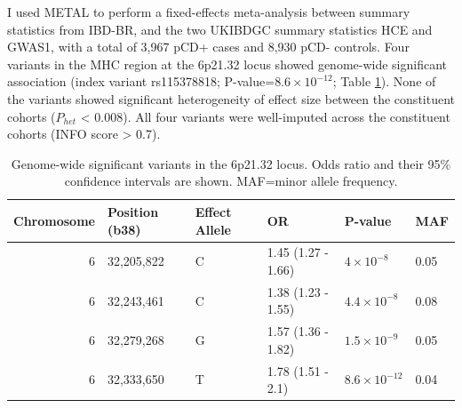 I used METAL to perform a fixed-effects meta-analysis between summary statistics from IBD-BR, and the two UKIBDGC summary statistics HCE and GWAS1, with a total of 3,967 pCD+ cases and 8,930 pCD- controls. 
  Four variants in the MHC region at the 6p21.32 locus showed genome-wide significant association (index variant rs115378818; P-value=$8.6\times10^{-12}$; Table \ref{table:gws}). None of the variants showed significant heterogeneity of effect size between the constituent cohorts ($P_{het}$ < 0.008). All four variants were well-imputed across the constituent cohorts (INFO score > 0.7).
  \begin{table}[H]
    \caption[pCD GWAS meta-analysis genome-wide significant SNPs]{Genome-wide significant variants in the 6p21.32 locus. Odds ratio and their 95\% confidence intervals are shown. MAF=minor allele frequency.}
    \label{table:gws}
    \centering\begingroup\fontsize{10}{12}\selectfont
    
    \begin{tabular}[t]{|r|l|l|l|l|l|}
    \hline
    Chromosome & Position (b38) & Effect Allele & OR & P-value & MAF\\
    \hline
    6 & 32,205,822 & C & 1.45 (1.27 - 1.66) & $4\times10^{-8}$ & 0.05\\
    \hline
    6 & 32,243,461 & C & 1.38 (1.23 - 1.55) & $4.4\times10^{-8}$ & 0.08\\
    \hline
    6 & 32,279,268 & G & 1.57 (1.36 - 1.82) & $1.5\times10^{-9}$ & 0.05\\
    \hline
    6 & 32,333,650 & T & 1.78 (1.51 - 2.1) & $8.6\times10^{-12}$ & 0.04\\
    \hline
    \end{tabular}
    \endgroup{}
    \end{table}

